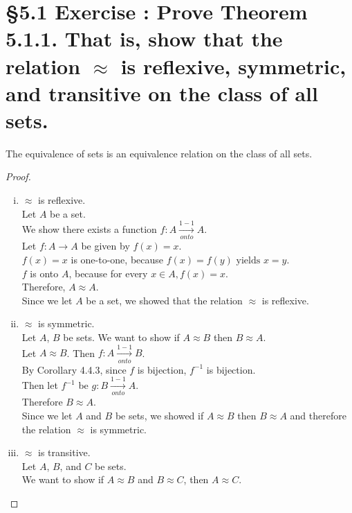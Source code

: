 \documentclass[a4paper,11pt]{article}
\begin{document}
\section*{\S 5.1 Exercise : Prove Theorem 5.1.1. That is, show that the relation \(\approx\) is reflexive, symmetric, and transitive on the class of all sets.}
\setcounter{SubsectionCounter}{2}
\begin{theorem1}
  The equivalence of sets is an equivalence relation on the class of all sets.
  \begin{proof}
    \begin{enumerate}[(i)]
      \item \(\approx\) is reflexive.\\
      Let \(A\) be a set.\\
      We show there exists a function \(f:A \xrightarrow[onto]{1-1} A\).\\
      Let \(f:A \rightarrow A\) be given by \(f{(x)}=x\).\\
      \(f{(x)}=x\) is one-to-one, because \(f{(x)}=f{(y)} \text{ yields } x = y\).\\
      \(f\) is onto \(A\), because for every \(x \in A, f{(x)}=x\).\\
      Therefore, \(A \approx A\).\\
      Since we let \(A\) be a set, we showed that the relation \(\approx\) is 
      reflexive.
      \item \(\approx\) is symmetric.\\
      Let \(A\), \(B\) be sets. We want to show if \(A \approx B\) then \(B \approx 
      A\).\\
      Let \(A \approx B\). Then \(f:A \xrightarrow[onto]{1-1} B\).\\
      By Corollary 4.4.3, since \(f\) is bijection, \(f^{-1}\) is bijection.\\
      Then let \(f^{-1}\) be \(g:B \xrightarrow[onto]{1-1}A\).\\
      Therefore \(B \approx A\).\\
      Since we let \(A\) and \(B\) be sets, we showed if \(A \approx B\) then \(B \approx 
      A\) and therefore the relation \(\approx\) is symmetric.
      \newpage
      \item \(\approx\) is transitive.\\
      Let \(A\), \(B\), and \(C\) be sets.\\
      We want to show if \(A \approx B\) and \(B \approx C\), then \(A \approx 
      C\).\\

\end{enumerate}
\end{proof}
\end{theorem1}
\end{document}
